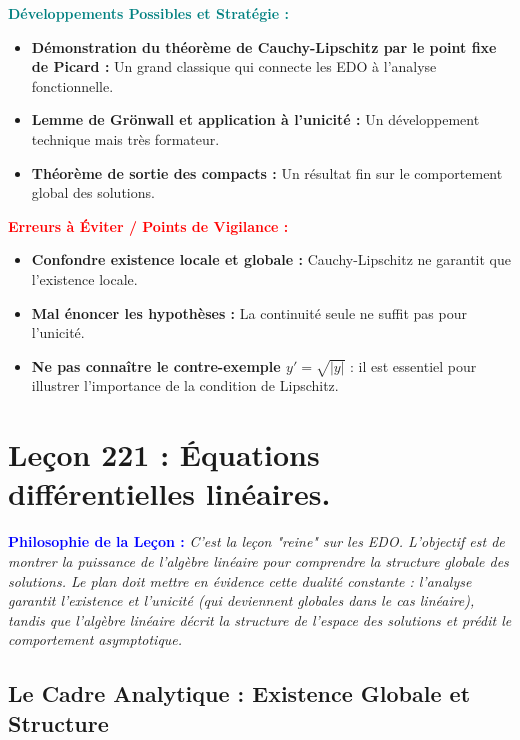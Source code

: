 \documentclass[12pt, a4paper, parskip=full]{report}
\theoremstyle{agregstyle}
\newenvironment{philosophie}
  {\par\medskip\noindent\begin{oframed}\noindent\textbf{\textcolor{blue}{Philosophie de la Leçon :}}\itshape}
  {\end{oframed}\par\medskip}
\newenvironment{developpements}
  {\par\medskip\noindent\begin{oframed}\noindent\textbf{\textcolor{teal}{Développements Possibles et Stratégie :}}}
  {\end{oframed}\par\medskip}
\newenvironment{erreurs}
  {\par\medskip\noindent\begin{oframed}\noindent\textbf{\textcolor{red}{Erreurs à Éviter / Points de Vigilance :}}}
  {\end{oframed}\par\medskip}
\begin{document}
\begin{developpements}
    \begin{itemize}
        \item \textbf{Démonstration du théorème de Cauchy-Lipschitz par le point fixe de Picard :} Un grand classique qui connecte les EDO à l'analyse fonctionnelle.
        \item \textbf{Lemme de Grönwall et application à l'unicité :} Un développement technique mais très formateur.
        \item \textbf{Théorème de sortie des compacts :} Un résultat fin sur le comportement global des solutions.
    \end{itemize}
\end{developpements}

\begin{erreurs}
    \begin{itemize}
        \item \textbf{Confondre existence locale et globale :} Cauchy-Lipschitz ne garantit que l'existence locale.
        \item \textbf{Mal énoncer les hypothèses :} La continuité seule ne suffit pas pour l'unicité.
        \item \textbf{Ne pas connaître le contre-exemple $y'=\sqrt{|y|}$} : il est essentiel pour illustrer l'importance de la condition de Lipschitz.
    \end{itemize}
\end{erreurs}
\chapter{Leçon 221 : Équations différentielles linéaires.}

\begin{philosophie}
    C'est la leçon "reine" sur les EDO. L'objectif est de montrer la puissance de l'algèbre linéaire pour comprendre la structure globale des solutions. Le plan doit mettre en évidence cette dualité constante : l'analyse garantit l'existence et l'unicité (qui deviennent globales dans le cas linéaire), tandis que l'algèbre linéaire décrit la structure de l'espace des solutions et prédit le comportement asymptotique.
\end{philosophie}

\section{Le Cadre Analytique : Existence Globale et Structure}
\end{document}
